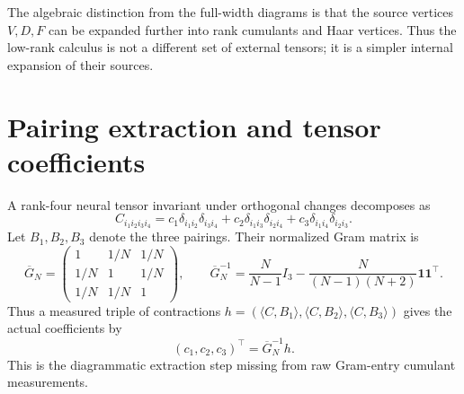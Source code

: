 \documentclass[11pt]{article}
\newcommand{\one}{\mathbf 1}
\begin{document}
\begin{center}
\end{center}

\noindent
The algebraic distinction from the full-width diagrams is that the source vertices $V,D,F$ can be expanded further into rank cumulants and Haar vertices.  Thus the low-rank calculus is not a different set of external tensors; it is a simpler internal expansion of their sources.

\section{Pairing extraction and tensor coefficients}

A rank-four neural tensor invariant under orthogonal changes decomposes as
\begin{equation}
C_{i_1i_2i_3i_4}
=c_1\delta_{i_1i_2}\delta_{i_3i_4}
+c_2\delta_{i_1i_3}\delta_{i_2i_4}
+c_3\delta_{i_1i_4}\delta_{i_2i_3}.
\label{eq:pairing}
\end{equation}
Let $B_1,B_2,B_3$ denote the three pairings.  Their normalized Gram matrix is
\begin{equation}
\overline G_N=
\begin{pmatrix}
1&1/N&1/N\\
1/N&1&1/N\\
1/N&1/N&1
\end{pmatrix},
\qquad
\overline G_N^{-1}=\frac{N}{N-1}I_3-\frac{N}{(N-1)(N+2)}\one\one^\top.
\label{eq:pairing-inv}
\end{equation}
Thus a measured triple of contractions $h=(\langle C,B_1\rangle,\langle C,B_2\rangle,\langle C,B_3\rangle)$ gives the actual coefficients by
\[
(c_1,c_2,c_3)^\top=\overline G_N^{-1}h.
\]
This is the diagrammatic extraction step missing from raw Gram-entry cumulant measurements.
\end{document}
